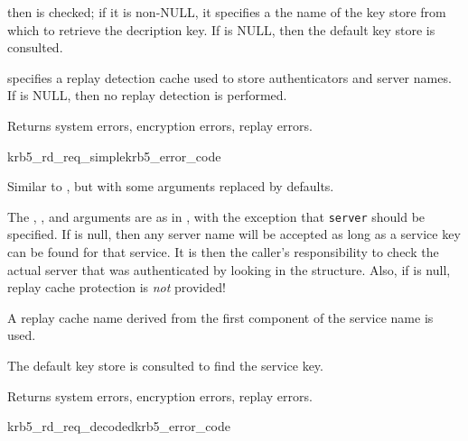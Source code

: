  then  is checked; if
it is non-NULL, it specifies a the name of the key store from which to
retrieve the decription key.  If  is NULL, then
the default key store is consulted.

 specifies a replay detection cache used to store
authenticators and server names.  If  is NULL, then no
replay detection is performed.

Returns system errors, encryption errors, replay errors.

\begin{funcdecl}{krb5_rd_req_simple}{krb5_error_code}{\funcin}
\funcout
{}
\end{funcdecl}

Similar to , but with some arguments replaced by
defaults.

The , ,  and
 arguments are as in , with
the exception that {\tt server} should be specified.  If
 is null, then any server name will be accepted as
long as a service key can be found for that service.  It is then the
caller's responsibility to check the actual server that was
authenticated by looking in the  structure.  Also,
if
 is null, replay cache protection is {\em not}
provided!  

A replay cache name derived from the first component of the service
name is used.

The default key store is consulted to find the service key.

Returns system errors, encryption errors, replay errors.


\begin{funcdecl}{krb5_rd_req_decoded}{krb5_error_code}{\funcin}
\funcendfuncarg
{}
\funcout
{}
\end{funcdecl}

